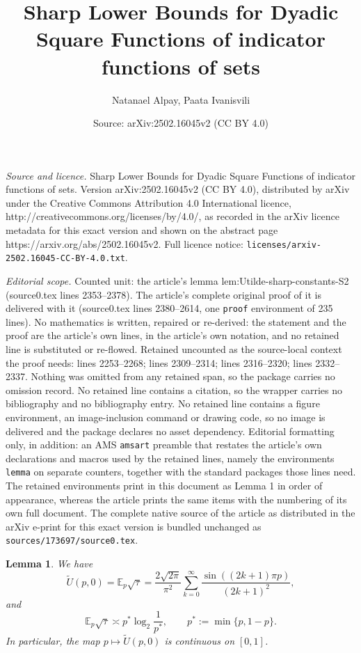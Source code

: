 \documentclass[10pt,a4paper]{amsart}
\title{Sharp Lower Bounds for Dyadic Square Functions of indicator functions of sets}
\author{Natanael Alpay, Paata Ivanisvili}
\date{Source: arXiv:2502.16045v2 (CC BY 4.0)}
\newtheorem{lemma}{Lemma}
\begin{document}
\maketitle

\noindent\emph{Source and licence.} Sharp Lower Bounds for Dyadic Square Functions of indicator functions of sets. Version arXiv:2502.16045v2 (CC BY 4.0), distributed by arXiv under the Creative Commons Attribution 4.0 International licence, http://creativecommons.org/licenses/by/4.0/, as recorded in the arXiv licence metadata for this exact version and shown on the abstract page https://arxiv.org/abs/2502.16045v2. Full licence notice: \texttt{licenses/arxiv-2502.16045-CC-BY-4.0.txt}.\par\smallskip

\noindent\textit{Editorial scope.} Counted unit: the article's lemma lem:Utilde-sharp-constants-S2 (source0.tex lines 2353--2378). The article's complete original proof of it is delivered with it (source0.tex lines 2380--2614, one \texttt{proof} environment of 235 lines). No mathematics is written, repaired or re-derived: the statement and the proof are the article's own lines, in the article's own notation, and no retained line is substituted or re-flowed.  Retained uncounted as the source-local context the proof needs: lines 2253--2268; lines 2309--2314; lines 2316--2320; lines 2332--2337.  Nothing was omitted from any retained span, so the package carries no omission record.  No retained line contains a citation, so the wrapper carries no bibliography and no bibliography entry.  No retained line contains a figure environment, an image-inclusion command or drawing code, so no image is delivered and the package declares no asset dependency.  Editorial formatting only, in addition: an AMS \texttt{amsart} preamble that restates the article's own declarations and macros used by the retained lines, namely the environments \texttt{lemma} on separate counters, together with the standard packages those lines need.  The retained environments print in this document as Lemma 1 in order of appearance, whereas the article prints the same items with the numbering of its own full document.  The complete native source of the article as distributed in the arXiv e-print for this exact version is bundled unchanged as \texttt{sources/173697/source0.tex}.
\begin{lemma}\label{lem:Utilde-asymptotic-S2}
We have
\begin{equation}
\label{eq:U-exten-sin}
\tilde U(p,0)=\mathbb E_p\sqrt{\tau}
=
\frac{2\sqrt{2\pi}}{\pi^2}\sum_{k=0}^\infty
\frac{\sin((2k+1)\pi p)}{(2k+1)^2},
\end{equation}
and
\[
\mathbb E_p\sqrt{\tau}\asymp p^*\log_2\frac1{p^*},
\qquad p^*:=\min\{p,1-p\}.
\]
In particular, the map $p\mapsto \tilde U(p,0)$ is continuous on $[0,1]$.
\end{lemma}
\end{document}
